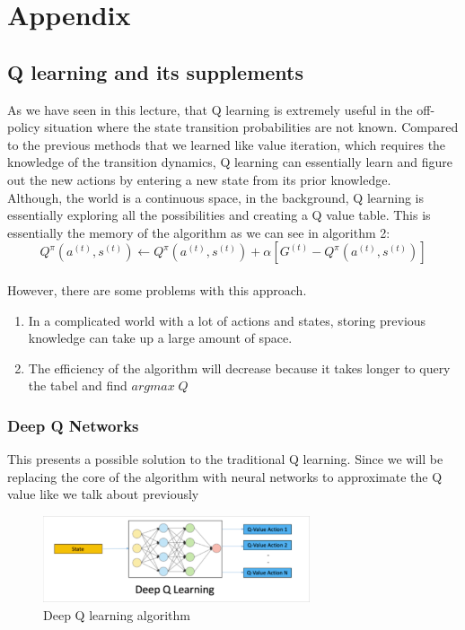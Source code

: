 \documentclass[11pt]{article}
\begin{document}
\section{Appendix}
\subsection{Q learning and its supplements}
As we have seen in this lecture, that Q learning is extremely useful in the off-policy situation where the state transition probabilities are not known. Compared to the previous methods that we learned like value iteration, which requires the knowledge of the transition dynamics, Q learning can essentially learn and figure out the new actions by entering a new state from its prior knowledge. \\
Although, the world is a continuous space, in the background, Q learning is essentially exploring all the possibilities and creating a Q value table. This is essentially the memory of the algorithm as we can see in algorithm 2:
$$Q^{\pi}(a^{(t)},s^{(t)}) \leftarrow Q^{\pi}(a^{(t)},s^{(t)}) + \alpha[G^{(t)} - Q^{\pi}(a^{(t)},s^{(t)})]$$ \\
However, there are some problems with this approach. 
\begin{enumerate}
    \item In a complicated world with a lot of actions and states, storing previous knowledge can take up a large amount of space.
    \item The efficiency of the algorithm will decrease because it takes longer to query the tabel and find $argmax \; Q$ 
\end{enumerate}

\subsubsection{Deep Q Networks}
This presents a possible solution to the traditional Q learning. Since we will be replacing the core of the algorithm with neural networks to approximate the Q value like we talk about previously

\begin{figure}[H]
    \centering
    \includegraphics[width=0.7\textwidth]{images/pic2.png}
    \caption{Deep Q learning algorithm}
    \label{fig:DQN}
\end{figure}
\end{document}
